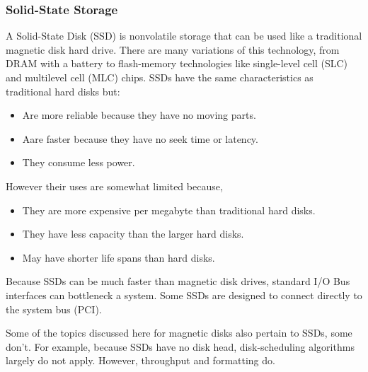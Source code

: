 \subsubsection{Solid-State Storage}\label{subsubsec:Solid_State_Storage}
A Solid-State Disk (SSD) is nonvolatile storage that can be used like a traditional magnetic disk hard drive.
There are many variations of this technology, from DRAM with a battery to flash-memory technologies like single-level cell (SLC) and multilevel cell (MLC) chips.
SSDs have the same characteristics as traditional hard disks but:
\begin{itemize}[noitemsep]
\item Are more reliable because they have no moving parts.
\item Aare faster because they have no seek time or latency.
\item They consume less power.
\end{itemize}

However their uses are somewhat limited because,
\begin{itemize}[noitemsep]
\item They are more expensive per megabyte than traditional hard disks.
\item They have less capacity than the larger hard disks.
\item May have shorter life spans than hard disks.
\end{itemize}

Because SSDs can be much faster than magnetic disk drives, standard I/O Bus interfaces can bottleneck a system.
Some SSDs are designed to connect directly to the system bus (PCI).

Some of the topics discussed here for magnetic disks also pertain to SSDs, some don't.
For example, because SSDs have no disk head, disk-scheduling algorithms largely do not apply.
However, throughput and formatting do.

